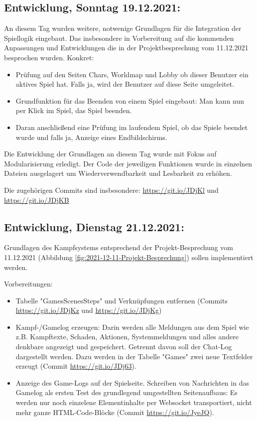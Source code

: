 \subsection{Entwicklung, Sonntag 19.12.2021:}

An diesem Tag wurden weitere, notwenige Grundlagen für die Integration der Spiellogik eingebaut. Das insbesondere in Vorbereitung auf die kommenden Anpassungen und Entwicklungen die in der Projektbesprechung vom 11.12.2021 besprochen wurden. 
Konkret: 

\begin{itemize}
	\item Prüfung auf den Seiten Chars, Worldmap und Lobby ob dieser Benutzer ein aktives Spiel hat. Falls ja, wird der Benutzer auf diese Seite umgeleitet.
	\item Grundfunktion für das Beenden von einem Spiel eingebaut: Man kann nun per Klick im Spiel, das Spiel beenden.
	\item Daran anschließend eine Prüfung im laufendem Spiel, ob das Spiele beendet wurde und falls ja, Anzeige eines Endbildschirms.
\end{itemize}

Die Entwicklung der Grundlagen an diesem Tag wurde mit Fokus auf Modularisierung erledigt. Der Code der jeweiligen Funktionen wurde in einzelnen Dateien ausgelagert um Wiederverwendbarkeit und Lesbarkeit zu erhöhen. 

Die zugehörigen Commits sind insbesondere: 
\url{https://git.io/JDjKl} und 
\url{https://git.io/JDjKB}


\subsection{Entwicklung, Dienstag 21.12.2021:}

Grundlagen des Kampfsystems entsprechend der Projekt-Besprechung vom 11.12.2021 (Abbildung \ref{fig:2021-12-11-Projekt-Besprechung}) sollen implementiert werden.

Vorbereitungen: 

\begin{itemize}
    \item Tabelle "GamesScenesSteps" und Verknüpfungen entfernen (Commits \url{https://git.io/JDjKz} und \url{https://git.io/JDjKg})
    \item Kampf-/Gamelog erzeugen: Darin werden alle Meldungen aus dem Spiel wie z.B. Kampftexte, Schaden, Aktionen, Systemmeldungen und alles andere denkbare angezeigt und gespeichert. Getrennt davon soll der Chat-Log dargestellt werden. Dazu werden in der Tabelle "Games" zwei neue Textfelder erzeugt (Commit \url{https://git.io/JDj63}). 
    \item Anzeige des Game-Logs auf der Spielseite. Schreiben von Nachrichten in das Gamelog als ersten Test des grundlegend umgestellten Seitenaufbaus: Es werden nur noch einzelene Elementinhalte per Websocket transportiert, nicht mehr ganze HTML-Code-Blöcke (Commit \url{https://git.io/JyeJQ}).
\end{itemize}



